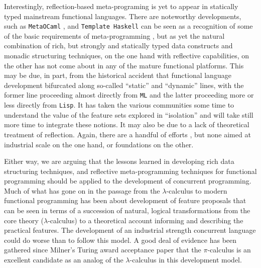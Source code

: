 Interestingly, reflection-based meta-programing is yet to appear in
statically typed mainstream functional languages. There are noteworthy
developments, such as \texttt{MetaOCaml} \cite{}, and \texttt{Template
  Haskell} \cite{} can be seen as a recognition of some of the basic
requirements of meta-programming \cite{}, but as yet the natural
combination of rich, but strongly and statically typed data constructs
and monadic structuring techniques, on the one hand with reflective
capabilities, on the other has not come about in any of the mature
functional platforms. This may be due, in part, from the historical
accident that functional language development bifurcated along
so-called ``static'' and ``dynamic'' lines, with the former line
proceeding almost directly from \texttt{ML} and the latter proceeding
more or less directly from \texttt{Lisp}. It has taken the various
communities some time to understand the value of the feature sets
explored in ``isolation'' and will take still more time to integrate
these notions. It may also be due to a lack of theoretical treatment
of reflection. Again, there are a handful of efforts \cite{}, but none
aimed at industrial scale on the one hand, or foundations on the
other.

Either way, we are arguing that the lessons learned in developing rich
data structuring techniques, and reflective meta-programming
techniques for functional programming should be applied to the
development of concurrent programming. Much of what has gone on in the
passage from the $\lambda$-calculus to modern functional programming
has been about development of feature proposals that can be seen in
terms of a succession of natural, logical transformations from the
core theory ($\lambda$-calculus) to a theoretical account informing
and describing the practical features. The development of an
industrial strength concurrent language could do worse than to follow
this model. A good deal of evidence has been gathered since Milner's
Turing award acceptance paper that the $\pi$-calculus is an excellent
candidate as an analog of the $\lambda$-calculus in this development
model.

